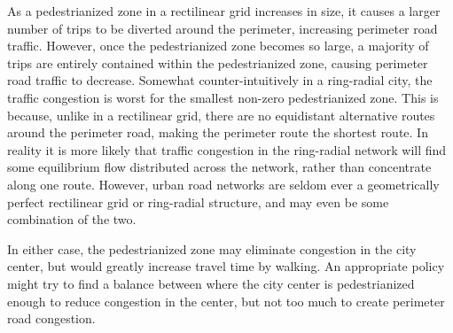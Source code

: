 \documentclass{elsarticle}\usepackage[]{graphicx}\usepackage[]{color}
\begin{document}
As a pedestrianized zone in a rectilinear grid increases in size, it causes a larger number of trips to be diverted around the perimeter, increasing perimeter road traffic. However, once the pedestrianized zone becomes so large, a majority of trips are entirely contained within the pedestrianized zone, causing perimeter road traffic to decrease. Somewhat counter-intuitively in a ring-radial city, the traffic congestion is worst for the smallest non-zero pedestrianized zone. This is because, unlike in a rectilinear grid, there are no equidistant alternative routes around the perimeter road, making the perimeter route the shortest route. In reality it is more likely that traffic congestion in the ring-radial network will find some equilibrium flow distributed across the network, rather than concentrate along one route. However, urban road networks are seldom ever a geometrically perfect rectilinear grid or ring-radial structure, and may even be some combination of the two. 

In either case, the pedestrianized zone may eliminate congestion in the city center, but would greatly increase travel time by walking. An appropriate policy might try to find a balance between where the city center is pedestrianized enough to reduce congestion in the center, but not too much to create perimeter road congestion.
\end{document}
